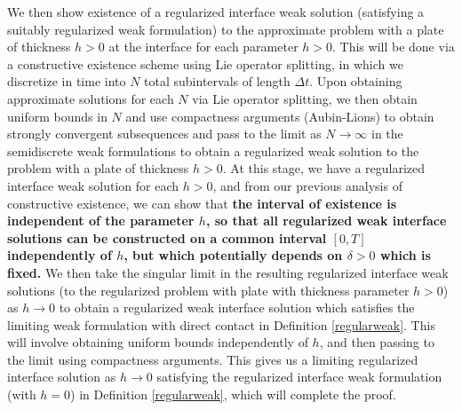 \documentclass[11pt]{article}
\theoremstyle{definition}
\begin{document}
\medskip

We then show existence of a regularized interface weak solution (satisfying a suitably regularized weak formulation) to the approximate problem with a plate of thickness $h > 0$ at the interface for each parameter $h > 0$. This will be done via a constructive existence scheme using Lie operator splitting, in which we discretize in time into $N$ total subintervals of length $\Delta t$. Upon obtaining approximate solutions for each $N$ via Lie operator splitting, we then obtain uniform bounds in $N$ and use compactness arguments (Aubin-Lions) to obtain strongly convergent subsequences and pass to the limit as $N \to \infty$ in the semidiscrete weak formulations to obtain a regularized weak solution to the problem with a plate of thickness $h > 0$. At this stage, we have a regularized interface weak solution for each $h > 0$, and from our previous analysis of constructive existence, we can show that \textbf{the interval of existence is independent of the parameter $h$, so that all regularized weak interface solutions can be constructed on a common interval $[0, T]$ independently of $h$, but which potentially depends on $\delta > 0$ which is fixed.} We then take the singular limit in the resulting regularized interface weak solutions (to the regularized problem with plate with thickness parameter $h > 0$) as $h \to 0$ to obtain a regularized weak interface solution which satisfies the limiting weak formulation with direct contact in Definition \ref{regularweak}. This will involve obtaining uniform bounds independently of $h$, and then passing to the limit using compactness arguments. This gives us a limiting regularized interface solution as $h \to 0$ satisfying the regularized interface weak formulation (with $h = 0$) in Definition \ref{regularweak}, which will complete the proof. 
\end{document}
